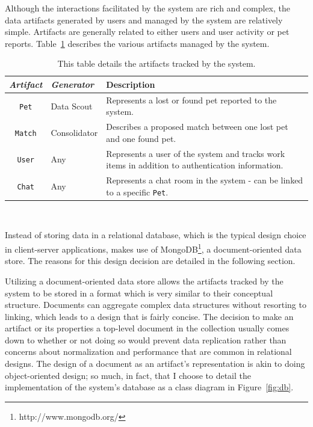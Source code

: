 Although the interactions facilitated by the system are rich and complex, the data artifacts generated by users and managed by the system are relatively simple.  Artifacts are generally related to either users and user activity or pet reports.  Table~\ref{table:artifacts} describes the various artifacts managed by the system.

\begin{table}[htb]
    \caption[Artifacts]{
	This table details the artifacts tracked by the system.
	}
    \begin{center}
    \begin{tabular}{|| c | l | p{7cm} ||} \hline
	{\em Artifact} & \em Generator & Description \\  \hline \hline
	{\tt Pet} & Data Scout & Represents a lost or found pet reported to the system. \\ \hline
	{\tt Match} & Consolidator & Describes a proposed match between one lost pet and one found pet. \\ \hline
	{\tt User} & Any & Represents a user of the system and tracks work items in addition to authentication information.  \\ \hline
	{\tt Chat} & Any & Represents a chat room in the system - can be linked to a specific {\tt Pet}. \\ \hline
	\end{tabular}
   \\ \rule{0mm}{5mm}
	\end{center}
	 \label{table:artifacts}
\end{table}

Instead of storing data in a relational database, which is the typical design choice in client-server applications, \nplh{} makes use of MongoDB\footnote{http://www.mongodb.org/}, a document-oriented data store.  The reasons for this design decision are detailed in the following section.

Utilizing a document-oriented data store allows the artifacts tracked by the system to be stored in a format which is very similar to their conceptual structure.  Documents can aggregate complex data structures without resorting to linking, which leads to a design that is fairly concise.  The decision to make an artifact or its properties a top-level document in the collection usually comes down to whether or not doing so would prevent data replication rather than concerns about normalization and performance that are common in relational designs.  The design of a document as an artifact's representation is akin to doing object-oriented design; so much, in fact, that I choose to detail the implementation of the system's database as a class diagram in Figure~\ref{fig:db}.

